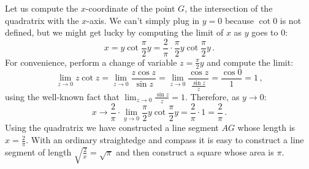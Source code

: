 Let us compute the $x$-coordinate of the point $G$, the intersection of the quadratrix with the $x$-axis. We can't simply plug in $y=0$ because $\cot 0$ is not defined, but we might get lucky by computing the limit of $x$ as $y$ goes to $0$:
\[
x = y\cot \frac{\pi}{2}y = \frac{2}{\pi}\cdot \frac{\pi}{2}y\cot \frac{\pi}{2}y\,.
\]
For convenience, perform a change of variable $z=\frac{\pi}{2}y$ and compute the limit:
\[
\lim_{z\rightarrow 0} z\cot z = \lim_{z\rightarrow 0} \frac{z\cos z}{\sin z} = \lim_{z\rightarrow 0} \frac{\cos z}{\frac{\sin z}{z}} = \frac{\cos 0}{1} = 1\,,
\]
using the well-known fact that $\displaystyle\lim_{z\rightarrow 0} \frac{\sin z}{z}=1$.
Therefore, as $y\rightarrow 0$:
\[
x \rightarrow \frac{2}{\pi}\cdot \lim_{y\rightarrow 0}\frac{\pi}{2}y\cot \frac{\pi}{2}y = \frac{2}{\pi}\cdot 1 = \frac{2}{\pi}\,.
\]
Using the quadratrix we have constructed a line segment $AG$ whose length is $x=\displaystyle\frac{2}{\pi}$. With an ordinary straightedge and compass it is easy to construct a line segment of length $\sqrt{\frac{2}{x}}=\sqrt{\pi}$ and then construct a square whose area is $\pi$.


